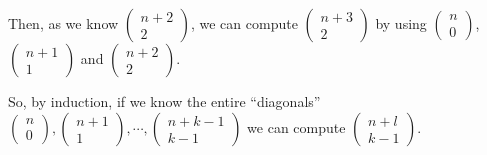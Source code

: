 \documentclass[a4paper,11pt]{report}
\begin{document}
Then, as we know $\begin{pmatrix} n + 2 \\ 2\end{pmatrix}$, we can compute
$\begin{pmatrix} n+3 \\ 2\end{pmatrix}$ by using $\begin{pmatrix} n \\
  0\end{pmatrix}$,$\begin{pmatrix} n+1 \\ 1\end{pmatrix}$ and $\begin{pmatrix}
  n+2 \\ 2\end{pmatrix}$.

So, by induction, if we know the entire ``diagonals'' $\begin{pmatrix} n \\
  0\end{pmatrix} , \begin{pmatrix} n+1 \\ 1\end{pmatrix},
\cdots, \begin{pmatrix} n+k-1 \\ k-1\end{pmatrix}$ we can compute
$\begin{pmatrix} n + l \\ k - 1\end{pmatrix}$.
\end{document}
